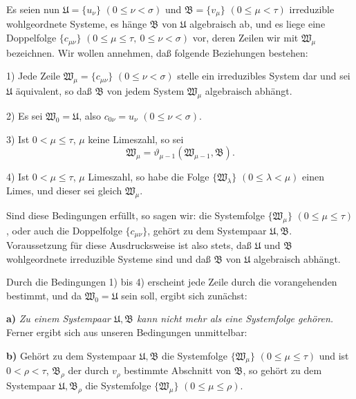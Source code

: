 Es seien nun \(\mathfrak U=\{u_\nu\}\) \((0\leq\nu<\sigma)\) und \(\mathfrak B=\{v_\mu\}\) \((0\leq\mu<\tau)\) irreduzible wohlgeordnete Systeme, es hänge \(\mathfrak B\) von \(\mathfrak U\) algebraisch ab, und es liege eine Doppelfolge \(\{c_{\mu\nu}\}\) \((0\leq\mu\leq\tau,\ 0\leq\nu<\sigma)\) vor, deren Zeilen wir mit \(\mathfrak W_\mu\) bezeichnen. Wir wollen annehmen, daß folgende Beziehungen bestehen:

1) Jede Zeile \(\mathfrak W_\mu=\{c_{\mu\nu}\}\) \((0\leq\nu<\sigma)\) stelle ein irreduzibles System dar und sei \(\mathfrak U\) äquivalent, so daß \(\mathfrak B\) von jedem System \(\mathfrak W_\mu\) algebraisch abhängt.

2) Es sei \(\mathfrak W_0=\mathfrak U\), also \(c_{0\nu}=u_\nu\) \((0\leq\nu<\sigma)\).

3) Ist \(0<\mu\leq\tau\), \(\mu\) keine Limeszahl, so sei
\[
\mathfrak W_\mu=\vartheta_{\mu-1}(\mathfrak W_{\mu-1},\mathfrak B).
\]

4) Ist \(0<\mu\leq\tau\), \(\mu\) Limeszahl, so habe die Folge \(\{\mathfrak W_\lambda\}\) \((0\leq\lambda<\mu)\) einen Limes, und dieser sei gleich \(\mathfrak W_\mu\).

Sind diese Bedingungen erfüllt, so sagen wir: die Systemfolge \(\{\mathfrak W_\mu\}\) \((0\leq\mu\leq\tau)\), oder auch die Doppelfolge \(\{c_{\mu\nu}\}\), gehört zu dem Systempaar \(\mathfrak U,\mathfrak B\). Voraussetzung für diese Ausdrucksweise ist also stets, daß \(\mathfrak U\) und \(\mathfrak B\) wohlgeordnete irreduzible Systeme sind und daß \(\mathfrak B\) von \(\mathfrak U\) algebraisch abhängt.

Durch die Bedingungen 1) bis 4) erscheint jede Zeile durch die vorangehenden bestimmt, und da \(\mathfrak W_0=\mathfrak U\) sein soll, ergibt sich zunächst:

\textbf{a)} \emph{Zu einem Systempaar \(\mathfrak U,\mathfrak B\) kann nicht mehr als eine Systemfolge gehören.} Ferner ergibt sich aus unseren Bedingungen unmittelbar:

\textbf{b)} Gehört zu dem Systempaar \(\mathfrak U,\mathfrak B\) die Systemfolge \(\{\mathfrak W_\mu\}\) \((0\leq\mu\leq\tau)\) und ist \(0<\rho<\tau\), \(\mathfrak B_\rho\) der durch \(v_\rho\) bestimmte Abschnitt von \(\mathfrak B\), so gehört zu dem Systempaar \(\mathfrak U,\mathfrak B_\rho\) die Systemfolge \(\{\mathfrak W_\mu\}\) \((0\leq\mu\leq\rho)\).

